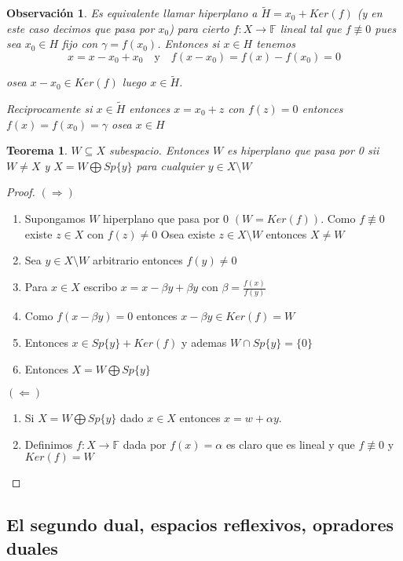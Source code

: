 \documentclass[10pt]{extarticle}
\theoremstyle{break}
\newtheorem{theorem}{Teorema}[section]
\newtheorem*{remark}{Observación}
\theoremstyle{definition}
\begin{document}
\begin{remark}
Es equivalente llamar \emph{hiperplano} a $\tilde{H}=x_{0}+Ker(f)$ (y en este caso decimos que pasa por $x_{0}$) para cierto $f : X\rightarrow \mathbb{F}$ lineal tal que $f\not\equiv 0$ pues sea $x_{0}\in H$ fijo con $\gamma=f(x_{0})$.
Entonces si $x\in H$ tenemos
$$x=x-x_{0}+x_{0}\quad\text{y}\quad f(x-x_{0})=f(x)-f(x_{0})=0$$

osea $x-x_{0}\in Ker(f)$ luego $x\in \tilde{H}$.

Reciprocamente si $x\in \tilde{H}$ entonces $x=x_{0}+z$ con $f(z)=0$ entonces $f(x)=f(x_{0})=\gamma$ osea $x\in H$

\end{remark}

\begin{theorem}
$W\subseteq X$ subespacio. Entonces $W$ es hiperplano que pasa por 0 sii $W\neq X$ y $X=W\bigoplus Sp\{ y \}$ para cualquier $y\in X\setminus W$
\end{theorem}


\begin{proof}
$(\Rightarrow)$
\begin{enumerate}
	\item Supongamos $W$ hiperplano que pasa por $0$ $(W=Ker(f))$. Como $f \not\equiv 0$ existe $z\in X$ con $f(z)\neq 0$
	Osea existe $z\in X\setminus W$ entonces $X\neq W$
	\item Sea $y\in X\setminus W$ arbitrario entonces $f(y)\neq 0$
	\item Para $x\in X$ escribo $x=x-\beta y+\beta y$ con $\beta= \frac{f(x)}{f(y)}$
	\item Como $f(x-\beta y)=0$ entonces $x-\beta y\in Ker(f)=W$
	\item Entonces $x\in Sp\{ y \}+Ker(f)$ y ademas $W\cap Sp\{ y \}=\{ 0 \}$
	\item Entonces $X=W\bigoplus Sp\{ y \}$
\end{enumerate}
$(\Leftarrow)$
\begin{enumerate}
	\item Si $X=W\bigoplus Sp\{ y \}$ dado $x\in X$ entonces $x=w+\alpha y$.
	\item Definimos $f : X\rightarrow \mathbb{F}$ dada por $f(x)=\alpha$ es claro que es lineal y que $f\not\equiv 0$ y $Ker(f)=W$
\end{enumerate}
\end{proof}

\subsection{El segundo dual, espacios reflexivos, opradores duales}
\end{document}
